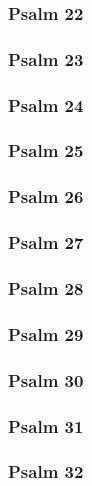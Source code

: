 \documentclass[12pt]{extarticle}
\begin{document}
\begin{multicols}{2}
\subsubsection{Psalm 22}

\newpage

\subsubsection{Psalm 23}

\newpage

\subsubsection{Psalm 24}

\newpage

\subsubsection{Psalm 25}

\newpage

\subsubsection{Psalm 26}

\newpage

\subsubsection{Psalm 27}

\newpage

\subsubsection{Psalm 28}

\newpage

\subsubsection{Psalm 29}

\newpage

\subsubsection{Psalm 30}

\newpage

\subsubsection{Psalm 31}

\newpage

\subsubsection{Psalm 32}

\newpage


\end{multicols}
\end{document}
